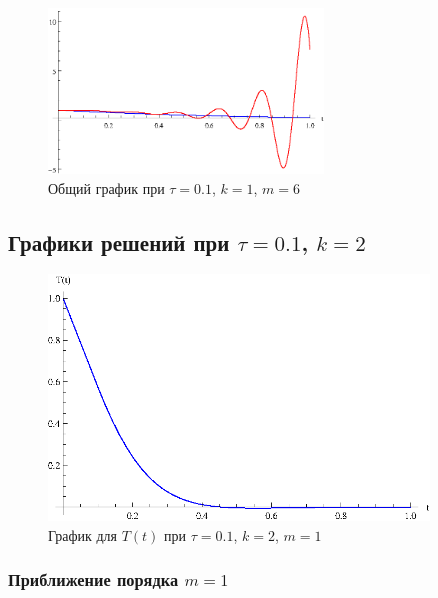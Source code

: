 \begin{figure}[h]
\begin{center}
\includegraphics[width=0.65\textwidth]{./3_results/1_13.eps}
\end{center}
\caption{Общий график при $\tau=0.1$, $k=1$, $m=6$}
\end{figure}

\newpage

\subsection{Графики решений при $\tau=0.1$, $k=2$}\label{sec:graph_2}

\vfill

\begin{figure}[h]
\begin{center}
\includegraphics[width=0.9\textwidth]{./3_results/2_1.eps}
\end{center}
\caption{График для $T(t)$ при $\tau=0.1$, $k=2$, $m=1$}
\end{figure}

\vfill

\newpage

\subsubsection{Приближение порядка $m=1$}

